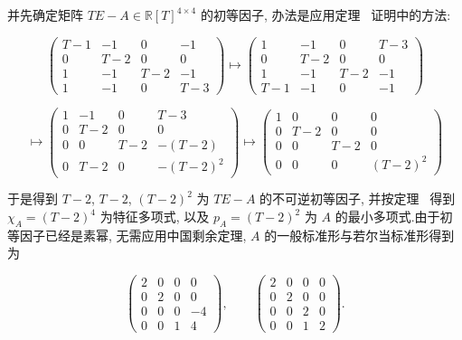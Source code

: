 并先确定矩阵 $TE - A \in \mathbb{R}[T]^{4 \times 4}$ 的初等因子, 办法是应用定理~ 证明中的方法:

\[
\left(\begin{array}{cccc} T - 1 & -1 & 0 & -1 \\ 0 & T - 2 & 0 & 0 \\ 1 & -1 & T - 2 & -1 \\ 1 & -1 & 0 & T - 3 \end{array}\right)
\longmapsto \left(\begin{array}{cccc} 1 & -1 & 0 & T - 3 \\ 0 & T - 2 & 0 & 0 \\ 1 & -1 & T - 2 & -1 \\ T - 1 & -1 & 0 & -1 \end{array}\right)\]

\[
\longmapsto \left(\begin{array}{cccc} 1 & -1 & 0 & T - 3 \\ 0 & T - 2 & 0 & 0 \\ 0 & 0 & T - 2 & -(T - 2) \\ 0 & T - 2 & 0 & -(T - 2)^2 \end{array}\right)
\longmapsto \left(\begin{array}{cccc} 1 & 0 & 0 & 0 \\ 0 & T - 2 & 0 & 0 \\ 0 & 0 & T - 2 & 0 \\ 0 & 0 & 0 & (T - 2)^2 \end{array}\right)\]

于是得到 $T - 2$, $T - 2$, $(T - 2)^2$ 为 $TE - A$ 的不可逆初等因子, 并按定理~ 得到 $\chi_A = (T - 2)^4$ 为特征多项式, 以及 $p_A = (T - 2)^2$ 为 $A$ 的最小多项式.由于初等因子已经是素幂, 无需应用中国剩余定理, $A$ 的一般标准形与若尔当标准形得到为

\[
\left(\begin{array}{cccc} 2 & 0 & 0 & 0 \\ 0 & 2 & 0 & 0 \\ 0 & 0 & 0 & -4 \\ 0 & 0 & 1 & 4 \end{array}\right), \qquad \left(\begin{array}{cccc} 2 & 0 & 0 & 0 \\ 0 & 2 & 0 & 0 \\ 0 & 0 & 2 & 0 \\ 0 & 0 & 1 & 2 \end{array}\right)\text{.}\]


